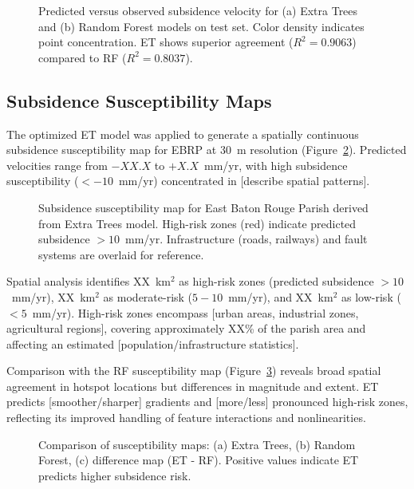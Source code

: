 \begin{figure}[!t]
\centering
\caption{Predicted versus observed subsidence velocity for (a) Extra Trees and (b) Random Forest models on test set. Color density indicates point concentration. ET shows superior agreement ($R^2 = 0.9063$) compared to RF ($R^2 = 0.8037$).}
\label{fig:predicted_vs_observed}
\end{figure}

\subsection{Subsidence Susceptibility Maps}

The optimized ET model was applied to generate a spatially continuous subsidence susceptibility map for EBRP at 30~m resolution (Figure~\ref{fig:susceptibility_map_et}). Predicted velocities range from $-XX.X$ to $+X.X$~mm/yr, with high subsidence susceptibility ($<-10$~mm/yr) concentrated in [describe spatial patterns].

\begin{figure}[!t]
\centering
\caption{Subsidence susceptibility map for East Baton Rouge Parish derived from Extra Trees model. High-risk zones (red) indicate predicted subsidence $>10$~mm/yr. Infrastructure (roads, railways) and fault systems are overlaid for reference.}
\label{fig:susceptibility_map_et}
\end{figure}

Spatial analysis identifies XX~km$^2$ as high-risk zones (predicted subsidence $>10$~mm/yr), XX~km$^2$ as moderate-risk ($5-10$~mm/yr), and XX~km$^2$ as low-risk ($<5$~mm/yr). High-risk zones encompass [urban areas, industrial zones, agricultural regions], covering approximately XX\% of the parish area and affecting an estimated [population/infrastructure statistics].

Comparison with the RF susceptibility map (Figure~\ref{fig:susceptibility_comparison}) reveals broad spatial agreement in hotspot locations but differences in magnitude and extent. ET predicts [smoother/sharper] gradients and [more/less] pronounced high-risk zones, reflecting its improved handling of feature interactions and nonlinearities.

\begin{figure}[!t]
\centering
\caption{Comparison of susceptibility maps: (a) Extra Trees, (b) Random Forest, (c) difference map (ET - RF). Positive values indicate ET predicts higher subsidence risk.}
\label{fig:susceptibility_comparison}
\end{figure}

